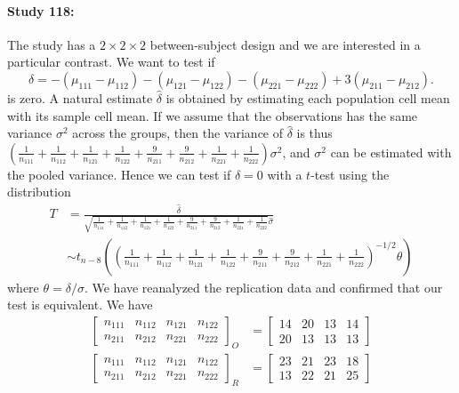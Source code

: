 \documentclass[11pt]{article}
\theoremstyle{definition}
\theoremstyle{custom}
\newcommand{\hdelta}{\hat{\delta}}
\newcommand{\hsigma}{\hat{\sigma}}
\begin{document}
  \paragraph{Study 118: \citet{Masicampo:2008jl}}
  The study has a $2 \times 2 \times 2$ between-subject design and we are interested in a particular contrast. We want to test if
  \[
  \delta = - (\mu_{111} - \mu_{112}) - (\mu_{121} - \mu_{122}) - (\mu_{221} - \mu_{222}) + 3 (\mu_{211} - \mu_{212}).
  \]
  is zero. A natural estimate $\hdelta$ is obtained by estimating each population cell mean with its sample cell mean. If we assume that the observations has the same variance $\sigma^2$ across the groups, then the variance of $\hdelta$ is thus $(\frac{1}{n_{111}} + \frac{1}{n_{112}} + \frac{1}{n_{121}} + \frac{1}{n_{122}} + \frac{9}{n_{211}} + \frac{9}{n_{212}} + \frac{1}{n_{221}} + \frac{1}{n_{222}}) \sigma^2$, and $\sigma^2$ can be estimated with the pooled variance. Hence we can test if $\delta = 0$ with a $t$-test using the distribution
  \begin{align*}
  T & = \frac{\hdelta}{\sqrt{\frac{1}{n_{111}} + \frac{1}{n_{112}} + \frac{1}{n_{121}} + \frac{1}{n_{122}} + \frac{9}{n_{211}} + \frac{9}{n_{212}} + \frac{1}{n_{221}} + \frac{1}{n_{222}}} \hsigma} \\
  & \sim t_{n-8}\left(\left(\frac{1}{n_{111}} + \frac{1}{n_{112}} + \frac{1}{n_{121}} + \frac{1}{n_{122}} + \frac{9}{n_{211}} + \frac{9}{n_{212}} + \frac{1}{n_{221}} + \frac{1}{n_{222}}\right)^{-1/2} \theta\right)
  \end{align*}
  where $\theta = \delta / \sigma$. We have reanalyzed the replication data and confirmed that our test is equivalent. We have
  \begin{align*}
  \begin{bmatrix}
  n_{111} & n_{112} & n_{121} & n_{122} \\
  n_{211} & n_{212} & n_{221} & n_{222}
  \end{bmatrix}_O & = \begin{bmatrix}
  14 & 20 & 13 & 14 \\
  20 & 13 & 13 & 13
  \end{bmatrix} \\
  \begin{bmatrix}
  n_{111} & n_{112} & n_{121} & n_{122} \\
  n_{211} & n_{212} & n_{221} & n_{222}
  \end{bmatrix}_R & = \begin{bmatrix}
  23 & 21 & 23 & 18 \\
  13 & 22 & 21 & 25
  \end{bmatrix}
  \end{align*}
\end{document}
